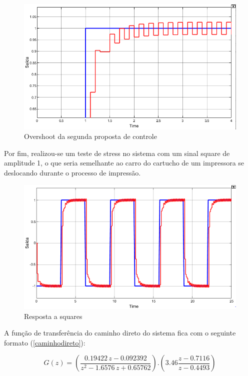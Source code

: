\documentclass[a4paper,11pt]{article}
\begin{document}
\begin{figure}[H]
    \centering
    \includegraphics[width=\linewidth]{src/tex/img/saida_controle_2_up.PNG}
    \caption{Overshoot da segunda proposta de controle}
    \label{fig:lgr}
\end{figure}

Por fim, realizou-se um teste de stress no sistema com um sinal square de amplitude 1, o que seria semelhante ao carro do cartucho de um impressora se deslocando durante o processo de impressão.

\begin{figure}[H]
    \centering
    \includegraphics[width=\linewidth]{src/tex/img/teste_square.PNG}
    \caption{Resposta a squares}
    \label{fig:lgr}
\end{figure}

A função de transferência do caminho direto do sistema fica com o seguinte formato (\ref{caminhodireto}):

\begin{equation}
G(z)=(\frac{0.19422\,z-0.092392}{z^2-1.6576\,z+0.65762}) . (3.46\frac{z - 0.7116}{z - 0.4493})
\label{caminhodireto}
\end{equation}
\end{document}

